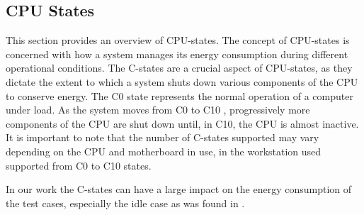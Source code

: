 \subsection{CPU States}\label{subsec:cpustates}

This section provides an overview of CPU-states. The concept of CPU-states is concerned with how a system manages its energy consumption during different operational conditions. The C-states are a crucial aspect of CPU-states, as they dictate the extent to which a system shuts down various components of the CPU to conserve energy. The C0 state represents the normal operation of a computer under load.\cite{CIntel,CHard} As the system moves from C0 to C10 \cite{biksbois}, progressively more components of the CPU are shut down until, in C10, the CPU is almost inactive. It is important to note that the number of C-states supported may vary depending on the CPU and motherboard in use, in \cite{biksbois} the workstation used supported from C0 to C10 states.


In our work the C-states can have a large impact on the energy consumption of the test cases, especially the idle case as was found in \cite{biksbois}.
